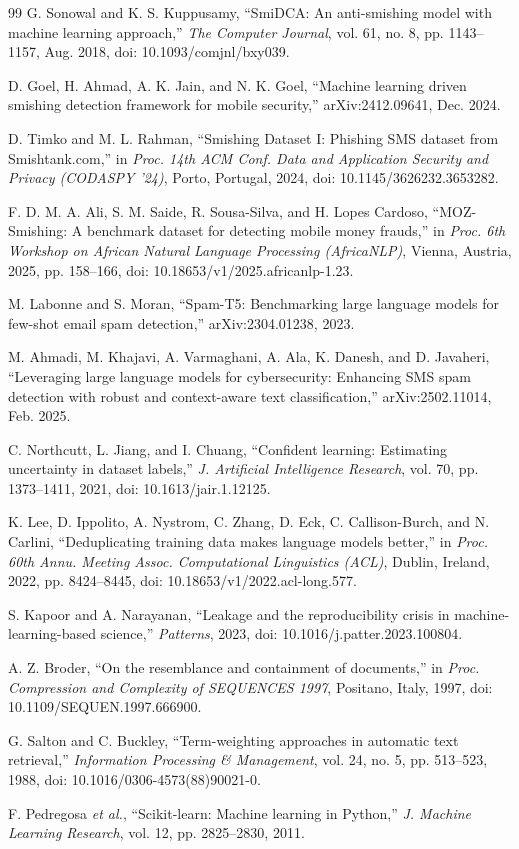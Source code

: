 \documentclass[conference]{IEEEtran}
\begin{document}
\begin{thebibliography}{99}
G. Sonowal and K. S. Kuppusamy, ``SmiDCA: An anti-smishing model with machine learning approach,'' \textit{The Computer Journal}, vol. 61, no. 8, pp. 1143--1157, Aug. 2018, doi: 10.1093/comjnl/bxy039.

D. Goel, H. Ahmad, A. K. Jain, and N. K. Goel, ``Machine learning driven smishing detection framework for mobile security,'' arXiv:2412.09641, Dec. 2024.

D. Timko and M. L. Rahman, ``Smishing Dataset I: Phishing SMS dataset from Smishtank.com,'' in \textit{Proc. 14th ACM Conf. Data and Application Security and Privacy (CODASPY '24)}, Porto, Portugal, 2024, doi: 10.1145/3626232.3653282.

F. D. M. A. Ali, S. M. Saide, R. Sousa-Silva, and H. Lopes Cardoso, ``MOZ-Smishing: A benchmark dataset for detecting mobile money frauds,'' in \textit{Proc. 6th Workshop on African Natural Language Processing (AfricaNLP)}, Vienna, Austria, 2025, pp. 158--166, doi: 10.18653/v1/2025.africanlp-1.23.

M. Labonne and S. Moran, ``Spam-T5: Benchmarking large language models for few-shot email spam detection,'' arXiv:2304.01238, 2023.

M. Ahmadi, M. Khajavi, A. Varmaghani, A. Ala, K. Danesh, and D. Javaheri, ``Leveraging large language models for cybersecurity: Enhancing SMS spam detection with robust and context-aware text classification,'' arXiv:2502.11014, Feb. 2025.

C. Northcutt, L. Jiang, and I. Chuang, ``Confident learning: Estimating uncertainty in dataset labels,'' \textit{J. Artificial Intelligence Research}, vol. 70, pp. 1373--1411, 2021, doi: 10.1613/jair.1.12125.

K. Lee, D. Ippolito, A. Nystrom, C. Zhang, D. Eck, C. Callison-Burch, and N. Carlini, ``Deduplicating training data makes language models better,'' in \textit{Proc. 60th Annu. Meeting Assoc. Computational Linguistics (ACL)}, Dublin, Ireland, 2022, pp. 8424--8445, doi: 10.18653/v1/2022.acl-long.577.

S. Kapoor and A. Narayanan, ``Leakage and the reproducibility crisis in machine-learning-based science,'' \textit{Patterns}, 2023, doi: 10.1016/j.patter.2023.100804.

A. Z. Broder, ``On the resemblance and containment of documents,'' in \textit{Proc. Compression and Complexity of SEQUENCES 1997}, Positano, Italy, 1997, doi: 10.1109/SEQUEN.1997.666900.

G. Salton and C. Buckley, ``Term-weighting approaches in automatic text retrieval,'' \textit{Information Processing \& Management}, vol. 24, no. 5, pp. 513--523, 1988, doi: 10.1016/0306-4573(88)90021-0.

F. Pedregosa \textit{et al.}, ``Scikit-learn: Machine learning in Python,'' \textit{J. Machine Learning Research}, vol. 12, pp. 2825--2830, 2011.

\end{thebibliography}
\end{document}
